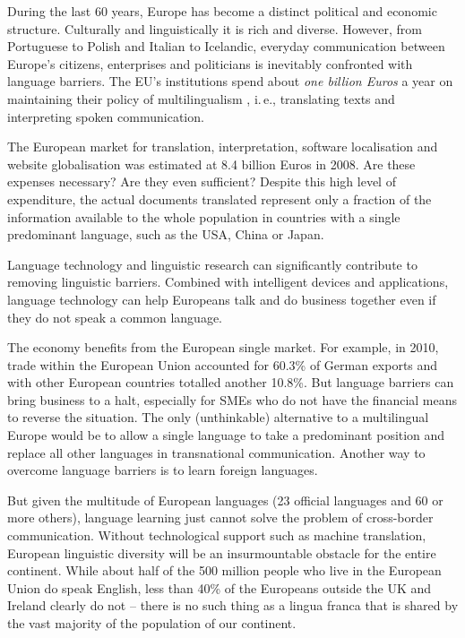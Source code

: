 \documentclass[10pt, plain]{../../metanetpaper}
\begin{document}
\begin{multicols}{2}
  During the last 60 years, Europe has become a distinct political and economic structure. Culturally and linguistically it is rich and diverse. However, from Portuguese to Polish and Italian to Icelandic, everyday communication between Europe's citizens, enterprises and politicians is inevitably confronted with language barriers. The EU's institutions spend about \emph{one billion Euros} a year on maintaining their policy of multilingualism \cite{EC7}, i.\,e., translating texts and interpreting spoken communication.

The European market for translation, interpretation, software localisation and website globalisation was estimated at 8.4 billion Euros in 2008. Are these expenses necessary? Are they even sufficient? Despite this high level of expenditure, the actual documents translated represent only a fraction of the information available to the whole population in countries with a single predominant language, such as the USA, China or Japan.

Language technology and linguistic research can significantly contribute to removing linguistic barriers. Combined with intelligent devices and applications, language technology can help Europeans talk and do business together even if they do not speak a common language.

The economy benefits from the European single market. For example, in 2010, trade within the European Union accounted for 60.3\% of German exports and with other European countries totalled another 10.8\%. But language barriers can bring business to a halt, especially for SMEs who do not have the financial means to reverse the situation. The only (unthinkable) alternative to a multilingual Europe \cite{lre2011} would be to allow a single language to take a predominant position and replace all other languages in transnational communication. Another way to overcome language barriers is to learn foreign languages.

But given the multitude of European languages (23 official languages and 60 or more others), language learning just cannot solve the problem of cross-border communication. Without technological support such as machine translation, European linguistic diversity will be an insurmountable obstacle for the entire continent. While about half of the 500 million people who live in the European Union do speak English, less than 40\% of the Europeans outside the UK and Ireland clearly do not -- there is no such thing as a lingua franca that is shared by the vast majority of the population of our continent. 


\end{multicols}
\end{document}
